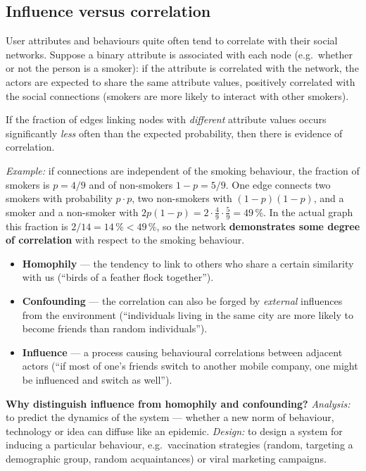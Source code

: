 \documentclass[11pt,a4paper]{article}
\theoremstyle{definition}
\providecommand{\uv}[1]{``#1''}
\begin{document}
\subsection{Influence versus correlation}

User attributes and behaviours quite often tend to correlate with their social networks. Suppose a
binary attribute is associated with each node (e.g.\ whether or not the person is a smoker): if the
attribute is correlated with the network, the actors are expected to share the same attribute values,
positively correlated with the social connections (smokers are more likely to interact with other
smokers).

\begin{defbox}
If the fraction of edges linking nodes with \emph{different} attribute values occurs significantly
\emph{less} often than the expected probability, then there is evidence of correlation.

\emph{Example:} if connections are independent of the smoking behaviour, the fraction of smokers is
$p=4/9$ and of non-smokers $1-p=5/9$. One edge connects two smokers with probability $p\cdot p$, two
non-smokers with $(1-p)(1-p)$, and a smoker and a non-smoker with
$2p(1-p)=2\cdot\frac49\cdot\frac59=49\,\%$. In the actual graph this fraction is
$2/14=14\,\%<49\,\%$, so the network \textbf{demonstrates some degree of correlation} with respect to
the smoking behaviour.
\end{defbox}

\begin{defbox}
\begin{itemize}
\item \textbf{Homophily} --- the tendency to link to others who share a certain similarity with us
      (\uv{birds of a feather flock together}).
\item \textbf{Confounding} --- the correlation can also be forged by \emph{external} influences from
      the environment (\uv{individuals living in the same city are more likely to become friends than
      random individuals}).
\item \textbf{Influence} --- a process causing behavioural correlations between adjacent actors
      (\uv{if most of one's friends switch to another mobile company, one might be influenced and
      switch as well}).
\end{itemize}
\textbf{Why distinguish influence from homophily and confounding?} \emph{Analysis:} to predict the
dynamics of the system --- whether a new norm of behaviour, technology or idea can diffuse like an
epidemic. \emph{Design:} to design a system for inducing a particular behaviour, e.g.\ vaccination
strategies (random, targeting a demographic group, random acquaintances) or viral marketing campaigns.
\end{defbox}
\end{document}
